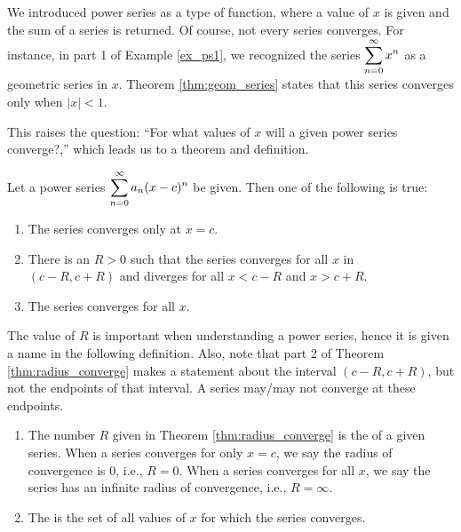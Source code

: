 We introduced power series as a type of function, where a value of $x$ is given and the sum of a series is returned. Of course, not every series converges. For instance, in part 1 of Example \ref{ex_ps1}, we recognized the series $\displaystyle \sum_{n=0}^\infty x^n$ as a geometric series in $x$. Theorem \ref{thm:geom_series} states that this series converges only when $|x|<1$. 

This raises the question: ``For what values of $x$ will a given power series converge?,'' which  leads us to a theorem and definition.

{Let a power series $\displaystyle \sum_{n=0}^\infty a_n(x-c)^n$ be given. Then one of the following is true:
\begin{enumerate}
	\item The series converges only at $x=c$.
	\item	There is an $R>0$ such that the series converges for all $x$ in \\	
	$(c-R,c+R)$ and diverges for all $x<c-R$ and $x>c+R$.
	\item	The series converges for all $x$.
\end{enumerate}
}

	
	The value of $R$ is important when understanding a power series, hence it is given a name in the following definition. Also, note that part 2 of Theorem \ref{thm:radius_converge} makes a statement about the interval $(c-R,c+R)$, but not the endpoints of that interval. A series may/may not converge at these endpoints.
	
	{  \begin{enumerate}
		\item The number $R$ given in Theorem \ref{thm:radius_converge} is the  of a given series. When a series converges for only $x=c$, we say the radius of convergence is 0, i.e.,  $R=0$. When a series converges for all $x$, we say the series has an infinite radius of convergence, i.e., $R=\infty$.
			\item	The  is the set of all values of $x$ for which the series converges.
	\end{enumerate}
	}

